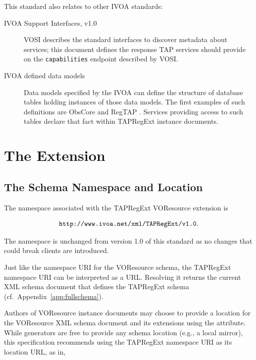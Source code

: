 \documentclass{ivoa}
\begin{document}
This standard also relates to other IVOA standards:


\begin{description}
\item[IVOA Support Interfaces, v1.0 \citep{std:VOSI}] \hfil\break VOSI describes the standard interfaces to discover metadata about
services; this document defines the response TAP services should
provide on the \texttt{capabilities} endpoint described by VOSI.
\item[IVOA defined data models]Data models specified by the IVOA can define the structure of
database tables holding instances of those data models.
The first examples of such definitions are ObsCore
\citep{std:OBSCORE} and RegTAP \citep{std:RegTAP}.  Services providing
access to such tables
declare that fact within TAPRegExt instance documents.

\end{description}


\section{The Extension}

\label{taextension}

\subsection{The Schema Namespace and Location}

\label{nsloc}

The namespace associated with the TAPRegExt VOResource extension is

$$
\mbox{\texttt{http://www.ivoa.net/xml/TAPRegExt/v1.0}.}
$$

The namespace is unchanged from version 1.0 of this standard as no
changes that could break clients are introduced.

Just like the namespace URI for the VOResource schema, the
TAPRegExt namespace URI can be interpreted as a URL.  Resolving it
returns the current XML schema document
that defines the TAPRegExt schema (cf.~Appendix~\ref{app:fullschema}).

Authors of VOResource instance documents may choose to
provide a location for the VOResource XML schema document and its
extensions using the
 attribute.  
While generators are
free to provide any schema location (e.g., a local mirror), this specification
recommends using the TAPRegExt namespace URI as its location URL,
as in,
\end{document}
